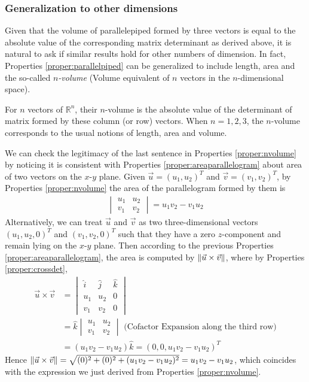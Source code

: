 \subsubsection{Generalization to other dimensions}
Given that the volume of parallelepiped formed by three vectors is equal to the absolute value of the corresponding matrix determinant as derived above, it is natural to ask if similar results hold for other numbers of dimension. In fact, Properties \ref{proper:parallelpiped} can be generalized to include length, area and the so-called \textit{$n$-volume} (Volume equivalent of $n$ vectors in the $n$-dimensional space).
\begin{proper}
\label{proper:nvolume}
For $n$ vectors of $\mathbb{R}^n$, their $n$-volume is the absolute value of the determinant of matrix formed by these column (or row) vectors. When $n=1,2,3$, the $n$-volume corresponds to the usual notions of length, area and volume.
\end{proper}
We can check the legitimacy of the last sentence in Properties \ref{proper:nvolume} by noticing it is consistent with Properties \ref{proper:areaparallelogram} about area of two vectors on the $x$-$y$ plane. Given $\vec{u} = (u_1, u_2)^T$ and $\vec{v} = (v_1, v_2)^T$, by Properties \ref{proper:nvolume} the area of the parallelogram formed by them is
\begin{align*}
\begin{vmatrix}
u_1 & u_2 \\
v_1 & v_2
\end{vmatrix} = u_1v_2 - v_1u_2
\end{align*}
Alternatively, we can treat $\vec{u}$ and $\vec{v}$ as two three-dimensional vectors $(u_1, u_2, 0)^T$ and $(v_1, v_2, 0)^T$ such that they have a zero $z$-component and remain lying on the $x$-$y$ plane. Then according to the previous Properties \ref{proper:areaparallelogram}, the area is computed by $\norm{\vec{u} \times \vec{v}}$, where by Properties \ref{proper:crossdet},
\begin{align*}
\vec{u} \times \vec{v} &= 
\begin{vmatrix}
\hat{i} & \hat{j} & \hat{k} \\
u_1 & u_2 & 0 \\
v_1 & v_2 & 0
\end{vmatrix} \\
&= \hat{k}\begin{vmatrix}
u_1 & u_2 \\
v_1 & v_2
\end{vmatrix} \text{ (Cofactor Expansion along the third row)}\\
&= (u_1v_2 - v_1u_2)\hat{k} = (0,0,u_1v_2 - v_1u_2)^T
\end{align*}
Hence $\norm{\vec{u} \times \vec{v}} = \sqrt{(0)^2 + (0)^2 + (u_1v_2 - v_1u_2)^2} = u_1v_2 - v_1u_2$, which coincides with the expression we just derived from Properties \ref{proper:nvolume}.

